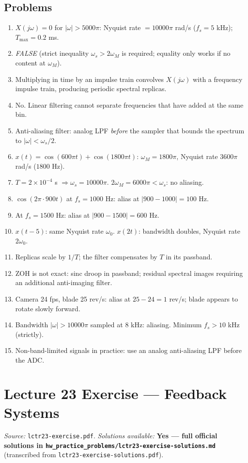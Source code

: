 \documentclass[11pt]{article}
\begin{document}
\subsection*{Problems}
\begin{enumerate}[leftmargin=*]
  \item $X(j\omega)=0$ for $|\omega|>5000\pi$: Nyquist rate $= 10000\pi$ rad/s ($f_s = 5$ kHz); $T_{\max} = 0.2$ ms.
  \item \emph{FALSE} (strict inequality $\omega_s > 2\omega_M$ is required; equality only works if no content at $\omega_M$).
  \item Multiplying in time by an impulse train convolves $X(j\omega)$ with a frequency impulse train, producing periodic spectral replicas.
  \item No. Linear filtering cannot separate frequencies that have added at the same bin.
  \item Anti-aliasing filter: analog LPF \emph{before} the sampler that bounds the spectrum to $|\omega|<\omega_s/2$.
  \item $x(t)=\cos(600\pi t)+\cos(1800\pi t)$: $\omega_M = 1800\pi$, Nyquist rate $3600\pi$ rad/s ($1800$ Hz).
  \item $T = 2\times 10^{-4}$ s $\Rightarrow \omega_s = 10000\pi$. $2\omega_M = 6000\pi < \omega_s$: no aliasing.
  \item $\cos(2\pi\cdot 900 t)$ at $f_s = 1000$ Hz: alias at $|900-1000| = 100$ Hz.
  \item At $f_s = 1500$ Hz: alias at $|900 - 1500|=600$ Hz.
  \item $x(t-5)$: same Nyquist rate $\omega_0$. $x(2t)$: bandwidth doubles, Nyquist rate $2\omega_0$.
  \item Replicas scale by $1/T$; the filter compensates by $T$ in its passband.
  \item ZOH is not exact: sinc droop in passband; residual spectral images requiring an additional anti-imaging filter.
  \item Camera 24 fps, blade 25 rev/s: alias at $25-24 = 1$ rev/s; blade appears to rotate slowly forward.
  \item Bandwidth $|\omega| > 10000\pi$ sampled at 8 kHz: aliasing. Minimum $f_s > 10$ kHz (strictly).
  \item Non-band-limited signals in practice: use an analog anti-aliasing LPF before the ADC.
\end{enumerate}

\section{Lecture 23 Exercise --- Feedback Systems}
\emph{Source:} \texttt{lctr23-exercise.pdf}. \emph{Solutions available:} \textbf{Yes --- full official solutions in \texttt{hw\_practice\_problems/lctr23-exercise-solutions.md}} (transcribed from \texttt{lctr23-exercise-solutions.pdf}).
\end{document}
